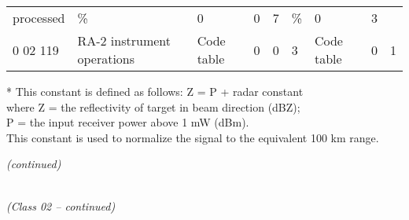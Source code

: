 \begin{longtable}[]{@{}lllllllll@{}}
\begin{minipage}[t]{0.08\columnwidth}
processed\strut
\end{minipage} & \begin{minipage}[t]{0.08\columnwidth}\raggedright
\%\strut
\end{minipage} & \begin{minipage}[t]{0.08\columnwidth}\raggedright
0\strut
\end{minipage} & \begin{minipage}[t]{0.08\columnwidth}\raggedright
0\strut
\end{minipage} & \begin{minipage}[t]{0.08\columnwidth}\raggedright
7\strut
\end{minipage} & \begin{minipage}[t]{0.08\columnwidth}\raggedright
\%\strut
\end{minipage} & \begin{minipage}[t]{0.08\columnwidth}\raggedright
0\strut
\end{minipage} & \begin{minipage}[t]{0.08\columnwidth}\raggedright
3\strut
\end{minipage}\tabularnewline
0 02 119 & RA-2 instrument operations & Code table & 0 & 0 & 3 & Code table & 0 & 1\tabularnewline
\bottomrule
\end{longtable}

* This constant is defined as follows: Z = P + radar constant\\
where Z = the reflectivity of target in beam direction (dBZ);\\
P = the input receiver power above 1 mW (dBm).\\
This constant is used to normalize the signal to the equivalent 100 km range.

\emph{(continued)}

\emph{\\
(Class 02 -- continued)}

